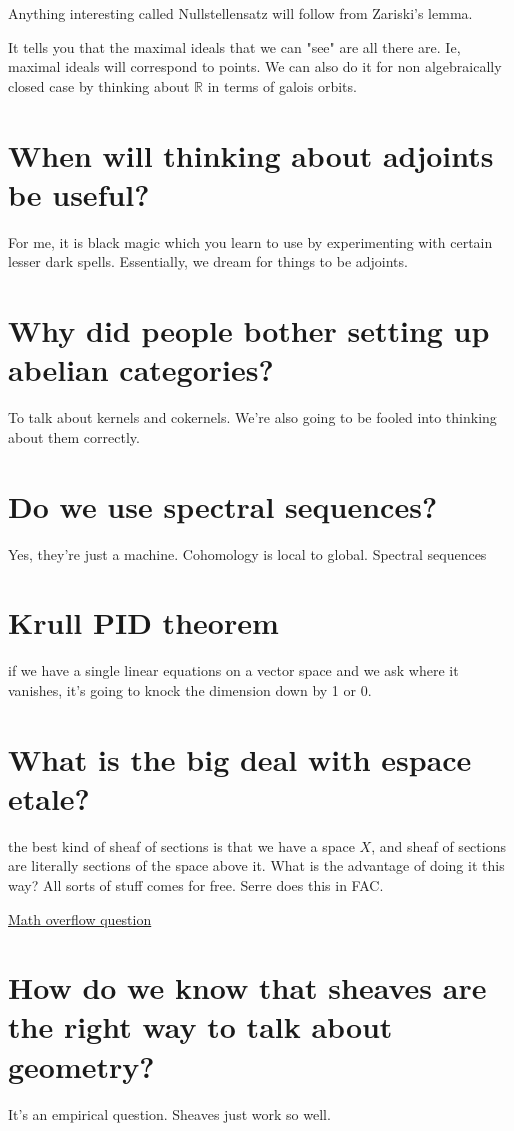 \documentclass{book}
\newcommand{\R}{\ensuremath{\mathbb{R}}}
\theoremstyle{definition}
\begin{document}
Anything interesting called Nullstellensatz will follow from Zariski's lemma.

It tells you that the maximal ideals that we can "see" are all there are. Ie, maximal
ideals will correspond to points. We can also do it for non algebraically closed
case by thinking about $\R$ in terms of galois orbits.


\section{When will thinking about adjoints be useful?}
For me, it is black magic which you learn to use by experimenting with certain
lesser dark spells. Essentially, we dream for things to be adjoints.

\section{Why did people bother setting up abelian categories?}
To talk about kernels and cokernels. We're also going to be fooled into
thinking about them correctly.

\section{Do we use spectral sequences?}
Yes, they're just a machine. Cohomology is local to global. Spectral sequences

\section{Krull PID theorem}
if we have a single linear equations on a vector space and we ask where it vanishes,
it's going to knock the dimension down by 1 or 0. 

\section{What is the big deal with espace etale?}
the best kind of sheaf of sections is that we have a space $X$, and sheaf of sections
are literally sections of the space above it. What is the advantage of doing it
this way? All sorts of stuff comes for free. Serre does this in FAC.

\href{https://mathoverflow.net/questions/96264/what-are-the-benefits-of-viewing-a-sheaf-from-the-espace-%C3%A9tal%C3%A9-perspective}{Math overflow question}

\section{How do we know that sheaves are the right way to talk about geometry?}
It's an empirical question. Sheaves just work so well.
\end{document}
